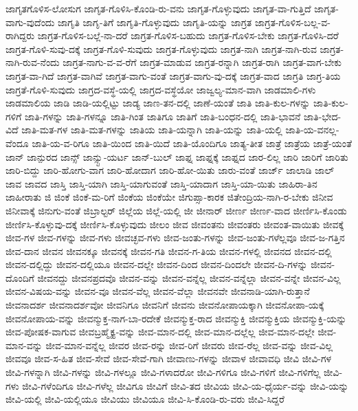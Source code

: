 {ಜಾಗೃತಗೊಳಿಸ-ಲೋಸುಗ
ಜಾಗೃತ-ಗೊಳಿಸಿ-ಕೊಂಡಿ-ರು-ವನು
ಜಾಗೃತ-ಗೊಳ್ಳುವುದು
ಜಾಗೃತ-ವಾ-ಗುತ್ತಿದೆ
ಜಾಗೃತ-ವಾಗು-ವುದೆಂದು
ಜಾಗೃತಿ
ಜಾಗೃ-ತಿಗೆ
ಜಾಗೃತಿ-ಗೊಳ್ಳುವುದು
ಜಾಗೃತಿ-ಯನ್ನು
ಜಾಗ್ರತ
ಜಾಗ್ರತ-ಗೊಳಿಸ-ಬಲ್ಲ-ವ-ರಾಗಿದ್ದರು
ಜಾಗ್ರತ-ಗೊಳಿಸ-ಬಲ್ಲೆ-ನಾ-ದರೆ
ಜಾಗ್ರತ-ಗೊಳಿಸ-ಬಹುದು
ಜಾಗ್ರತ-ಗೊಳಿಸ-ಬೇಕು
ಜಾಗ್ರತ-ಗೊಳಿಸಿ-ದರೆ
ಜಾಗ್ರತ-ಗೊಳಿ-ಸುವು-ದಕ್ಕೆ
ಜಾಗ್ರತ-ಗೊಳಿ-ಸುವುದು
ಜಾಗ್ರತ-ಗೊಳ್ಳುವುದು
ಜಾಗ್ರತ-ನಾಗಿ
ಜಾಗ್ರತ-ನಾಗಿ-ರುವ
ಜಾಗ್ರತ-ನಾಗಿ-ರುವ-ನೆಂದು
ಜಾಗ್ರತ-ನಾಗು-ವ-ವ-ರೆಗೆ
ಜಾಗ್ರತ-ಮಾಡುವ
ಜಾಗ್ರತ-ರನ್ನಾಗಿ
ಜಾಗ್ರತ-ರಾಗಿ
ಜಾಗ್ರತ-ವಾಗ-ಬೇಕು
ಜಾಗ್ರತ-ವಾ-ಗಿದೆ
ಜಾಗ್ರತ-ವಾಗಿವೆ
ಜಾಗ್ರತ-ವಾಗು-ವಂತೆ
ಜಾಗ್ರತ-ವಾಗು-ವು-ದಕ್ಕೆ
ಜಾಗ್ರತ-ವಾದ
ಜಾಗ್ರತಿ
ಜಾಗ್ರ-ತಿಯ
ಜಾಗ್ರತೆ-ಗೊಳಿ-ಸುವುದು
ಜಾಗ್ರದ-ವಸ್ಥೆ-ಯಲ್ಲಿ
ಜಾಗ್ರದ-ವಸ್ಥೆಯೋ
ಜಾಜ್ವಲ್ಯ-ಮಾನ-ವಾಗಿ
ಜಾಡಮಾಲಿ-ಗಳು
ಜಾಡಮಾಲಿಯ
ಜಾಡಿ
ಜಾಡಿ-ಯಲ್ಲಿಟ್ಟು
ಜಾಡ್ಯ
ಜಾಣ-ತನ-ದಲ್ಲಿ
ಜಾಣೆ-ಯಂತೆ
ಜಾತಿ
ಜಾತಿ-ಕುಲ-ಗಳನ್ನು
ಜಾತಿ-ಕುಲ-ಗಳಿಗೆ
ಜಾತಿ-ಗಳನ್ನು
ಜಾತಿ-ಗಳನ್ನೂ
ಜಾತಿ-ಗಿಂತ
ಜಾತಿಗೂ
ಜಾತಿಗೆ
ಜಾತಿ-ಬಂಧನ-ದಲ್ಲಿ
ಜಾತಿ-ಭಾವನೆ
ಜಾತಿ-ಭೇದ-ವಿದೆ
ಜಾತಿ-ಮತ-ಗಳ
ಜಾತಿ-ಮತ-ಗಳನ್ನು
ಜಾತಿಯ
ಜಾತಿ-ಯನ್ನಾಗಿ
ಜಾತಿ-ಯನ್ನು
ಜಾತಿ-ಯಲ್ಲಿ
ಜಾತಿ-ಯ-ವನಲ್ಲ-ವೆಂದೂ
ಜಾತಿ-ಯ-ವ-ರಿಗೂ
ಜಾತಿ-ಯಿಂದ
ಜಾತಿ-ಯಿದೆ
ಜಾತಿ-ಯೊಂದಿಗೂ
ಜಾತ್ಯ-ತೀತ
ಜಾತ್ರೆ
ಜಾತ್ರೆಯ
ಜಾತ್ರೆ-ಯಂತೆ
ಜಾನ್
ಜಾನ್ಪುರದ
ಜಾನ್ಸ್
ಜಾನ್ಸ್ಟು-ಯರ್ಟ
ಜಾನ್-ಬುಲ್
ಜಾಫ್ನ
ಜಾಫ್ನಕ್ಕೆ
ಜಾಫ್ನದ
ಜಾರ-ಲಿಲ್ಲ
ಜಾರಿ
ಜಾರಿಗೆ
ಜಾರಿತು
ಜಾರಿ-ಬಿದ್ದು
ಜಾರಿ-ಹೋಗು-ವಾಗ
ಜಾರಿ-ಹೋದಾಗ
ಜಾರಿ-ಹೋ-ಯಿತು
ಜಾರು-ವಂತೆ
ಜಾರ್ಜ್
ಜಾಲಾಡಿ
ಜಾಲ್
ಜಾವ
ಜಾವದ
ಜಾಸ್ತಿ
ಜಾಸ್ತಿ-ಯಾಗಿ
ಜಾಸ್ತಿ-ಯಾಗುವಂತೆ
ಜಾಸ್ತಿ-ಯಾದಾಗ
ಜಾಸ್ತಿ-ಯಾ-ಯಿತು
ಜಾಹಿರಾ-ತಿನ
ಜಾಹೀರಾತು
ಜಿ
ಜಿಂಕೆ
ಜಿಂಕೆ-ಮ-ರಿಗೆ
ಜಿಂಕೆಯ
ಜಿಂಕೆಯೇ
ಜಿಗುಪ್ಸಾ-ಕಾರಕ
ಜಿತೇಂದ್ರಿಯ-ನಾಗಿ-ರ-ಬೇಕು
ಜಿನೀವ
ಜಿನೀವಾಕ್ಕೆ
ಜಿನುಗು-ವಂತೆ
ಜಿಬ್ರಾಲ್ಟರ್
ಜಿಲ್ಲೆಯ
ಜಿಲ್ಲೆ-ಯಲ್ಲಿ
ಜೀ
ಜೀನಾರ್
ಜೀರ್ಣ
ಜೀರ್ಣ-ವಾದ
ಜೀರ್ಣಿಸಿ-ಕೊಂಡು
ಜೀರ್ಣಿಸಿ-ಕೊಳ್ಳುವು-ದಕ್ಕೆ
ಜೀರ್ಣಿಸಿ-ಕೊಳ್ಳುವುದು
ಜೀಲಂ
ಜೀವ
ಜೀವಂತನು
ಜೀವಂತರು
ಜೀವಂತ-ವಾಯಿತು
ಜೀವಕ್ಕೆ
ಜೀವ-ಗಳ
ಜೀವ-ಗಳನ್ನು
ಜೀವ-ಗಳು
ಜೀವಚ್ಛವ-ಗಳು
ಜೀವ-ಜಂತು-ಗಳನ್ನು
ಜೀವ-ಜಂತು-ಗಳೆಲ್ಲವೂ
ಜೀವ-ಜ-ಗತ್ತಿನ
ಜೀವ-ದಾನ
ಜೀವನ
ಜೀವನಕ್ಕೂ
ಜೀವನಕ್ಕೆ
ಜೀವನ-ಗತಿ
ಜೀವನ-ಗ-ತಿಯ
ಜೀವನ-ಗಳಲ್ಲಿ
ಜೀವನದ
ಜೀವನ-ದಲ್ಲಿ
ಜೀವನ-ದಲ್ಲಿದ್ದು
ಜೀವನ-ದಲ್ಲಿಯೂ
ಜೀವನ-ದಲ್ಲೇ
ಜೀವನ-ದಿಂದ
ಜೀವನ-ದಿಂದಲೇ
ಜೀವನ-ದಿ-ಗಳನ್ನು
ಜೀವನ-ದೊಂದಿಗೆ
ಜೀವನದ್ದು
ಜೀವನಪ್ರದವೊ
ಜೀವನ-ವನ್ನು
ಜೀವನ-ವನ್ನೆಲ್ಲ
ಜೀವನ-ವನ್ನೆಲ್ಲಾ
ಜೀವನ-ವನ್ನೇ
ಜೀವನ-ವಿಲ್ಲ
ಜೀವನ-ವಿಷಯ-ವನ್ನು
ಜೀವನ-ವೂ
ಜೀವನ-ವೆಲ್ಲ
ಜೀವನ-ವೆಲ್ಲಾ
ಜೀವನವೇ
ಜೀವನಾಡಿ-ಯಾಗಿ-ರುತ್ತಾನೆ
ಜೀವನಾದರ್ಶ
ಜೀವನಾದರ್ಶವೋ
ಜೀವನಿಗೂ
ಜೀವನಿಗೆ
ಜೀವನು
ಜೀವನೋಪಾಯಕ್ಕಾಗಿ
ಜೀವನೋಪಾ-ಯಕ್ಕೆ
ಜೀವನೋಪಾಯ-ವನ್ನು
ಜೀವನ್ಮುಕ್ತ-ನಾಗ-ಬಾ-ರದೇಕೆ
ಜೀವನ್ಮುಕ್ತ-ರಾದ
ಜೀವನ್ಮುಕ್ತಿ
ಜೀವನ್ಮುಕ್ತಿಯ
ಜೀವನ್ಮುಕ್ತಿ-ಯನ್ನು
ಜೀವ-ಪೋಷಕ-ವಾಗುವ
ಜೀವಬ್ರಹ್ಮೈಕ್ಯ-ವನ್ನು
ಜೀವ-ಮಾನ-ದಲ್ಲಿ
ಜೀವ-ಮಾನ-ದಲ್ಲೆಲ್ಲ
ಜೀವ-ಮಾನ-ದಲ್ಲೇ
ಜೀವ-ಮಾನ-ವನ್ನು
ಜೀವ-ಮಾನ-ವನ್ನೆಲ್ಲ
ಜೀವರ
ಜೀವ-ರನ್ನು
ಜೀವ-ರಿಗೆ
ಜೀವರು
ಜೀವ-ರೆಲ್ಲ
ಜೀವ-ವನ್ನು
ಜೀವ-ವಿಲ್ಲ
ಜೀವವೂ
ಜೀವ-ಸ-ಹಿತ
ಜೀವ-ಸೇವೆ
ಜೀವ-ಸೇವೆ-ಗಾಗಿ
ಜೀವಾಣು-ಗಳನ್ನು
ಜೀವಾಳ
ಜೀವಾವಧಿ
ಜೀವಿ
ಜೀವಿ-ಗಳ
ಜೀವಿ-ಗಳನ್ನಾಗಿ
ಜೀವಿ-ಗಳನ್ನು
ಜೀವಿ-ಗಳಲ್ಲೂ
ಜೀವಿ-ಗಳಾದರೋ
ಜೀವಿ-ಗಳಿಗೂ
ಜೀವಿ-ಗಳಿಗೆ
ಜೀವಿ-ಗಳಿಗೆಲ್ಲ
ಜೀವಿ-ಗಳು
ಜೀವಿ-ಗಳೆಂದಿಗೂ
ಜೀವಿ-ಗಳೆಲ್ಲ
ಜೀವಿಗೂ
ಜೀವಿಗೆ
ಜೀವಿ-ತದ
ಜೀವಿಯ
ಜೀವಿ-ಯ-ಧೈರ್ಯ-ವನ್ನು
ಜೀವಿ-ಯನ್ನು
ಜೀವಿ-ಯಲ್ಲಿ
ಜೀವಿ-ಯಲ್ಲಿಯೂ
ಜೀವಿಯು
ಜೀವಿಯೂ
ಜೀವಿ-ಸಿ-ಕೊಂಡಿ-ರು-ವರು
ಜೀವಿ-ಸಿದ್ದರೆ
}
